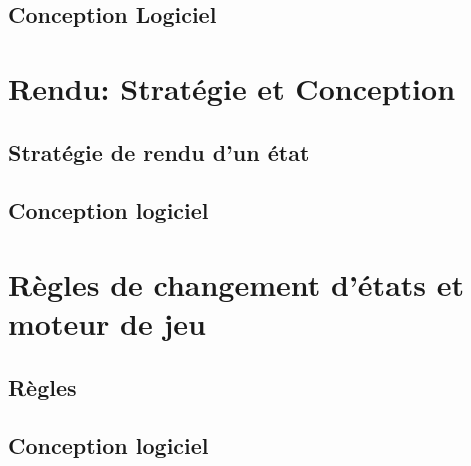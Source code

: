 \documentclass[a4paper,12pt]{article}
\begin{document}
\subsection{Conception Logiciel}



\clearpage
\section{Rendu: Stratégie et Conception}

\subsection{Stratégie de rendu d'un état}


\subsection{Conception logiciel}


\clearpage
\section{Règles de changement d'états et moteur de jeu}

\subsection{Règles}

\clearpage
\subsection{Conception logiciel}


\end{document}

